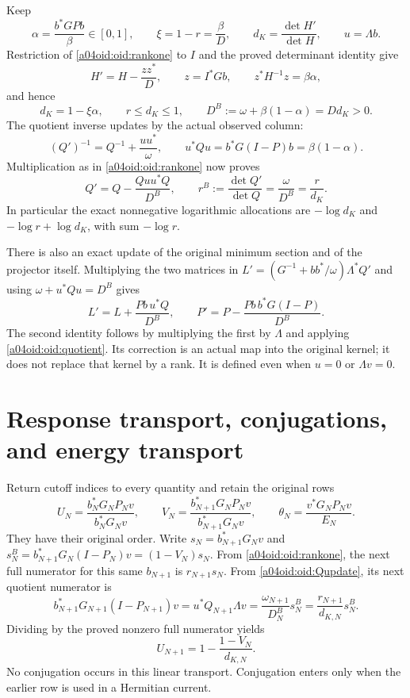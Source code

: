 \documentclass[11pt,a4paper]{article}
\begin{document}
Keep
\[
 \alpha=\frac{b^*GPb}{\beta}\in[0,1],\qquad
 \xi=1-r=\frac\beta D,\qquad
 d_K=\frac{\det H'}{\det H},\qquad u=\Lambda b.
\]
Restriction of \eqref{a04oid:oid:rankone} to $I$ and the proved determinant
identity give
\[
 H'=H-\frac{zz^*}{D},\qquad z=I^*Gb,\qquad
 z^*H^{-1}z=\beta\alpha,
\]
and hence
\begin{equation}\label{a04oid:oid:allocations}
 d_K=1-\xi\alpha,\qquad r\le d_K\le1,\qquad
 D^B:=\omega+\beta(1-\alpha)=Dd_K>0.
\end{equation}
The quotient inverse updates by the actual observed column:
\[
 (Q')^{-1}=Q^{-1}+\frac{uu^*}{\omega},\qquad
 u^*Qu=b^*G(I-P)b=\beta(1-\alpha).
\]
Multiplication as in \eqref{a04oid:oid:rankone} now proves
\begin{equation}\label{a04oid:oid:Qupdate}
 Q'=Q-\frac{Quu^*Q}{D^B},\qquad
 r^B:=\frac{\det Q'}{\det Q}
 =\frac\omega{D^B}=\frac r{d_K}.
\end{equation}
In particular the exact nonnegative logarithmic allocations are
$-\log d_K$ and $-\log r+\log d_K$, with sum $-\log r$.

There is also an exact update of the original minimum section and
of the projector itself. Multiplying the two matrices in
$L'=(G^{-1}+bb^*/\omega)\Lambda^*Q'$ and using
$\omega+u^*Qu=D^B$ gives
\begin{equation}\label{a04oid:oid:projector}
 L'=L+\frac{Pb\,u^*Q}{D^B},\qquad
 P'=P-\frac{Pb\,b^*G(I-P)}{D^B}.
\end{equation}
The second identity follows by multiplying the first by $\Lambda$
and applying \eqref{a04oid:oid:quotient}. Its correction is an actual map
into the original kernel; it does not replace that kernel by a rank.
It is defined even when $u=0$ or $\Lambda v=0$.

\section{Response transport, conjugations, and energy transport}

Return cutoff indices to every quantity and retain the original rows
\begin{equation}\label{a04oid:oid:UV}
 U_N=\frac{b_N^*G_NP_Nv}{b_N^*G_Nv},\qquad
 V_N=\frac{b_{N+1}^*G_NP_Nv}{b_{N+1}^*G_Nv},\qquad
 \theta_N=\frac{v^*G_NP_Nv}{E_N}.
\end{equation}
They have their original order. Write
$s_N=b_{N+1}^*G_Nv$ and
$s_N^B=b_{N+1}^*G_N(I-P_N)v=(1-V_N)s_N$.
From \eqref{a04oid:oid:rankone}, the next full numerator for this same
$b_{N+1}$ is $r_{N+1}s_N$. From \eqref{a04oid:oid:Qupdate}, its next
quotient numerator is
\begin{equation}\label{a04oid:oid:transportnumerator}
 b_{N+1}^*G_{N+1}(I-P_{N+1})v
 =u^*Q_{N+1}\Lambda v
 =\frac{\omega_{N+1}}{D_N^B}s_N^B
 =\frac{r_{N+1}}{d_{K,N}}s_N^B.
\end{equation}
Dividing by the proved nonzero full numerator yields
\begin{equation}\label{a04oid:oid:response}
 \boxed{U_{N+1}=1-\frac{1-V_N}{d_{K,N}}.}
\end{equation}
No conjugation occurs in this linear transport. Conjugation enters
only when the earlier row is used in a Hermitian current.
\end{document}
